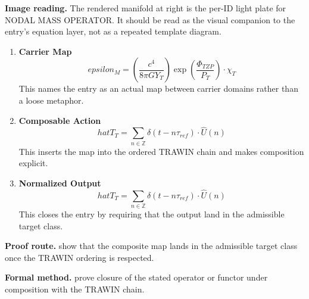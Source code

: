 \begin{samepage}
\noindent\begin{minipage}[t]{0.45\linewidth}
\vspace{0pt}
\raggedright
\scriptsize\textbf{Image reading.} The rendered manifold at right is the per-ID light plate for NODAL MASS OPERATOR. It should be read as the visual companion to the entry's equation layer, not as a repeated template diagram.\par
\end{minipage}\hfill
\begin{minipage}[t]{0.53\linewidth}
\vspace*{-0.10in}
\raggedright
{}
\end{minipage}
\end{samepage}

\clearpage


\begin{enumerate}[leftmargin=1.6em,itemsep=9pt,topsep=6pt]
\item \textbf{Carrier Map}
\[
epsilon_M = \left( \frac{c^4}{8\pi G Y_T} \right) \exp\left(\frac{\Phi_{TZP}}{P_T}\right) \cdot \chi_T
\]
This names the entry as an actual map between carrier domains rather than a loose metaphor.

\item \textbf{Composable Action}
\[
hat{T}_T = \sum_{n \in \mathbb{Z}} \delta(t - n\tau_{ref}) \cdot \hat{U}(n)
\]
This inserts the map into the ordered TRAWIN chain and makes composition explicit.

\item \textbf{Normalized Output}
\[
hat{T}_T = \sum_{n \in \mathbb{Z}} \delta(t - n\tau_{ref}) \cdot \hat{U}(n)
\]
This closes the entry by requiring that the output land in the admissible target class.
\end{enumerate}

\textbf{Proof route.} show that the composite map lands in the admissible target class once the TRAWIN ordering is respected.

\textbf{Formal method.} prove closure of the stated operator or functor under composition with the TRAWIN chain.

\medskip
{}

